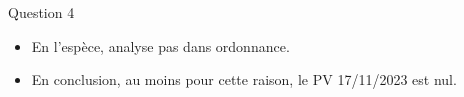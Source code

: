 \begin{frame}{Question 4}

\begin{itemize}
    \item En l'espèce, analyse pas dans ordonnance.
    \item En conclusion, au moins pour cette raison,
    le PV 17/11/2023 est nul.
\end{itemize}

\end{frame}
